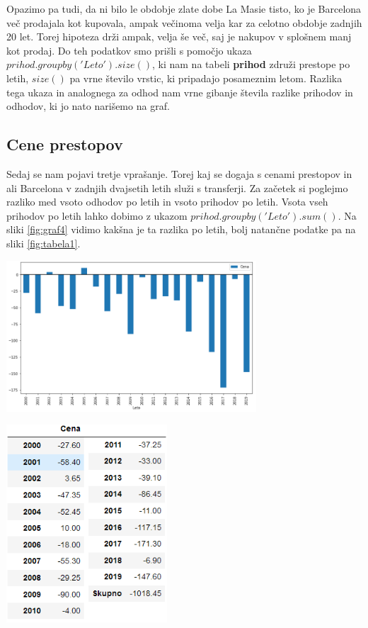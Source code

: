 \documentclass[a4paper, 12pt]{article}
\begin{document}
Opazimo pa tudi, da ni bilo le obdobje zlate dobe La Masie tisto, ko je Barcelona več prodajala kot kupovala, ampak večinoma velja kar za celotno obdobje zadnjih 20 let. Torej hipoteza drži ampak, velja še več, saj je nakupov v splošnem manj kot prodaj.
Do teh podatkov smo prišli s pomočjo ukaza $prihod.groupby('Leto').size()$, ki nam na tabeli \textbf{prihod} združi prestope po letih, $size()$ pa vrne število vrstic, ki pripadajo posameznim letom. 
Razlika tega ukaza in analognega za odhod nam vrne gibanje števila razlike prihodov in odhodov, ki jo nato narišemo na graf. \medskip

\subsection{Cene prestopov}
Sedaj se nam pojavi tretje vprašanje. Torej kaj se dogaja s cenami prestopov in ali Barcelona v zadnjih dvajsetih letih služi s transferji. 
Za začetek si poglejmo razliko med vsoto odhodov po letih in vsoto prihodov po letih. Vsota vseh prihodov po letih lahko dobimo z ukazom $prihod.groupby('Leto').sum()$. Na sliki \ref{fig:graf4} vidimo kakšna je ta razlika po letih, bolj natančne podatke pa na sliki \ref{fig:tabela1}. 

\begin{center}
\includegraphics[width=0.7\textwidth]{graf4}
\label{fig:graf4}

\includegraphics[width=0.45\textwidth]{tabela1}
\label{fig:tabela1}
\end{center}
\end{document}
